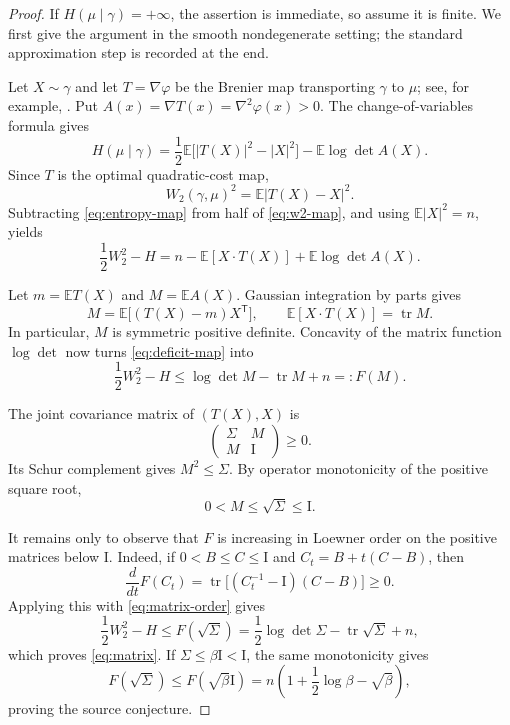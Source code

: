 \documentclass[11pt]{article}
\newcommand{\E}{\mathbb E}
\newcommand{\tr}{\operatorname{tr}}
\newcommand{\Id}{\mathrm I}
\begin{document}
\begin{proof}
If $H(\mu\mid\gamma)=+\infty$, the assertion is immediate, so assume it is
finite.  We first give the argument in the smooth nondegenerate setting; the
standard approximation step is recorded at the end.

Let $X\sim\gamma$ and let $T=\nabla\varphi$ be the Brenier map transporting
$\gamma$ to $\mu$; see, for example, \cite[Chapter 10]{Villani}.  Put
$A(x)=\nabla T(x)=\nabla^2\varphi(x)>0$.  The change-of-variables formula
gives
\begin{equation}\label{eq:entropy-map}
 H(\mu\mid\gamma)
 =\frac12\E\bigl[|T(X)|^2-|X|^2\bigr]-\E\log\det A(X).
\end{equation}
Since $T$ is the optimal quadratic-cost map,
\begin{equation}\label{eq:w2-map}
 W_2(\gamma,\mu)^2=\E|T(X)-X|^2.
\end{equation}
Subtracting \eqref{eq:entropy-map} from half of \eqref{eq:w2-map}, and using
$\E|X|^2=n$, yields
\begin{equation}\label{eq:deficit-map}
 \frac12W_2^2-H=n-\E[X\cdot T(X)]+\E\log\det A(X).
\end{equation}

Let $m=\E T(X)$ and $M=\E A(X)$.  Gaussian integration by parts gives
\begin{equation}\label{eq:stein}
 M=\E\bigl[(T(X)-m)X^{\mathsf T}\bigr],
 \qquad
 \E[X\cdot T(X)]=\tr M.
\end{equation}
In particular, $M$ is symmetric positive definite.  Concavity of the matrix
function $\log\det$ now turns \eqref{eq:deficit-map} into
\begin{equation}\label{eq:jensen}
 \frac12W_2^2-H
 \leq \log\det M-\tr M+n=:F(M).
\end{equation}

The joint covariance matrix of $(T(X),X)$ is
\[
 \begin{pmatrix}
  \Sigma&M\\ M&\Id
 \end{pmatrix}\geq0.
\]
Its Schur complement gives $M^2\leq\Sigma$.  By operator monotonicity of the
positive square root,
\begin{equation}\label{eq:matrix-order}
 0<M\leq\sqrt\Sigma\leq\Id.
\end{equation}

It remains only to observe that $F$ is increasing in Loewner order on the
positive matrices below $\Id$.  Indeed, if $0<B\leq C\leq\Id$ and
$C_t=B+t(C-B)$, then
\[
 \frac{d}{dt}F(C_t)
 =\tr\bigl[(C_t^{-1}-\Id)(C-B)\bigr]\geq0.
\]
Applying this with \eqref{eq:matrix-order} gives
\[
 \frac12W_2^2-H
 \leq F(\sqrt\Sigma)
 =\frac12\log\det\Sigma-\tr\sqrt\Sigma+n,
\]
which proves \eqref{eq:matrix}.  If $\Sigma\leq\beta\Id<\Id$, the same
monotonicity gives
\[
 F(\sqrt\Sigma)\leq F(\sqrt\beta\Id)
 =n\left(1+\frac12\log\beta-\sqrt\beta\right),
\]
proving the source conjecture.


\end{proof}
\end{document}
